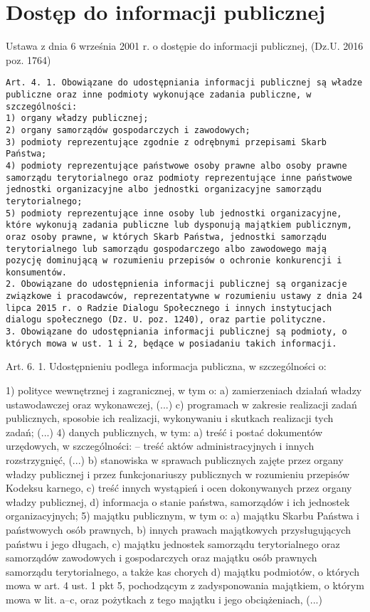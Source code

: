 \section{Dostęp do informacji publicznej}

Ustawa z dnia 6 września 2001 r. o dostępie do informacji publicznej, (Dz.U. 2016 poz. 1764)

\begin{lstlisting}
Art. 4. 1. Obowiązane do udostępniania informacji publicznej są władze publiczne oraz inne podmioty wykonujące zadania publiczne, w szczególności:
1) organy władzy publicznej;
2) organy samorządów gospodarczych i zawodowych;
3) podmioty reprezentujące zgodnie z odrębnymi przepisami Skarb Państwa;
4) podmioty reprezentujące państwowe osoby prawne albo osoby prawne samorządu terytorialnego oraz podmioty reprezentujące inne państwowe jednostki organizacyjne albo jednostki organizacyjne samorządu terytorialnego;
5) podmioty reprezentujące inne osoby lub jednostki organizacyjne, które wykonują zadania publiczne lub dysponują majątkiem publicznym, oraz osoby prawne, w których Skarb Państwa, jednostki samorządu terytorialnego lub samorządu gospodarczego albo zawodowego mają pozycję dominującą w rozumieniu przepisów o ochronie konkurencji i konsumentów.
2. Obowiązane do udostępnienia informacji publicznej są organizacje związkowe i pracodawców, reprezentatywne w rozumieniu ustawy z dnia 24 lipca 2015 r. o Radzie Dialogu Społecznego i innych instytucjach dialogu społecznego (Dz. U. poz. 1240), oraz partie polityczne.
3. Obowiązane do udostępniania informacji publicznej są podmioty, o których mowa w ust. 1 i 2, będące w posiadaniu takich informacji.	 
\end{lstlisting}


Art. 6. 1. Udostępnieniu podlega informacja publiczna, w szczególności o:

1) polityce wewnętrznej i zagranicznej, w tym o:
a) zamierzeniach działań władzy ustawodawczej oraz wykonawczej,
(...)
c) programach w zakresie realizacji zadań publicznych, sposobie ich realizacji, wykonywaniu i skutkach realizacji tych zadań;
(...)
4) danych publicznych, w tym:
a) treść i postać dokumentów urzędowych, w szczególności:
– treść aktów administracyjnych i innych rozstrzygnięć,
(...)
b) stanowiska w sprawach publicznych zajęte przez organy władzy publicznej i przez funkcjonariuszy publicznych w rozumieniu przepisów Kodeksu karnego,
c) treść innych wystąpień i ocen dokonywanych przez organy władzy publicznej,
d) informacja o stanie państwa, samorządów i ich jednostek organizacyjnych;
5) majątku publicznym, w tym o:
a) majątku Skarbu Państwa i państwowych osób prawnych,
b) innych prawach majątkowych przysługujących państwu i jego długach,
c) majątku jednostek samorządu terytorialnego oraz samorządów zawodowych i gospodarczych oraz majątku osób prawnych samorządu terytorialnego, a także kas chorych d) majątku podmiotów, o których mowa w art. 4 ust. 1 pkt 5, pochodzącym z zadysponowania majątkiem, o którym mowa w lit. a–c, oraz pożytkach z tego majątku i jego obciążeniach,
(...)

